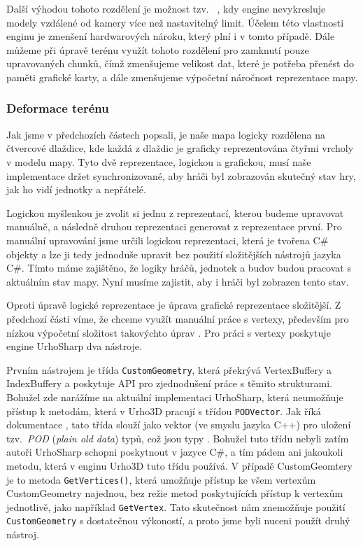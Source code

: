 Další výhodou tohoto rozdělení je možnost tzv.~ , kdy engine nevykresluje modely vzdálené od kamery více než nastavitelný limit. Účelem této vlastnosti enginu je zmenšení hardwarových nároku, který plní i v tomto případě. Dále můžeme při úpravě terénu využít tohoto rozdělení pro zamknutí pouze upravovaných chunků, čímž zmenšujeme velikost dat, které je potřeba přenést do paměti grafické karty, a dále zmenšujeme výpočetní náročnost reprezentace mapy.

\subsubsection{Deformace terénu}
Jak jsme v předchozích částech popsali, je naše mapa logicky rozdělena na čtvercové dlaždice, kde každá z dlaždic je graficky reprezentována čtyřmi vrcholy v modelu mapy. Tyto dvě reprezentace, logickou a grafickou, musí naše implementace držet synchronizované, aby hráči byl zobrazován skutečný stav hry, jak ho vidí jednotky a nepřátelé. 

Logickou myšlenkou je zvolit si jednu z reprezentací, kterou budeme upravovat manuálně, a následně druhou reprezentaci generovat z reprezentace první. Pro manuální upravování jsme určili logickou reprezentaci, která je tvořena C\# objekty a lze ji tedy jednoduše upravit bez použití složitějších nástrojů jazyka C\#. Tímto máme zajištěno, že logiky hráčů, jednotek a budov budou pracovat s aktuálním stav mapy. Nyní musíme zajistit, aby i hráči byl zobrazen tento stav.

Oproti úpravě logické reprezentace je úprava grafické reprezentace složitější. Z předchozí části víme, že chceme využít manuální práce s vertexy, především pro nízkou výpočetní složitost takovýchto úprav . Pro práci s vertexy poskytuje engine UrhoSharp dva nástroje. 

Prvním nástrojem je třída \texttt{CustomGeometry}, která překrývá VertexBuffery a IndexBuffery a poskytuje API pro zjednodušení práce s těmito strukturami. Bohužel zde narážíme na aktuální implementaci UrhoSharp, která neumožňuje přístup k metodám, která v Urho3D pracují s třídou \texttt{PODVector}. Jak říká dokumentace \citep{site:urho3DPOD}, tato třída slouží jako vektor (ve smyslu jazyka C++) pro uložení tzv.~\textit{POD} (\textit{plain old data}) typů, což jsou typy \textit{} . Bohužel tuto třídu nebyli zatím autoři UrhoSharp schopni poskytnout v jazyce C\#, a tím pádem ani jakoukoli metodu, která v enginu Urho3D tuto třídu používá. V případě CustomGeomtery je to metoda \texttt{GetVertices()}, která umožňuje přístup ke všem vertexům CustomGeometry najednou, bez režie metod poskytujících přístup k vertexům jednotlivě, jako například \texttt{GetVertex}. Tato skutečnost nám znemožňuje použití \texttt{CustomGeometry} s dostatečnou výkoností, a proto jsme byli nuceni použít druhý nástroj.

